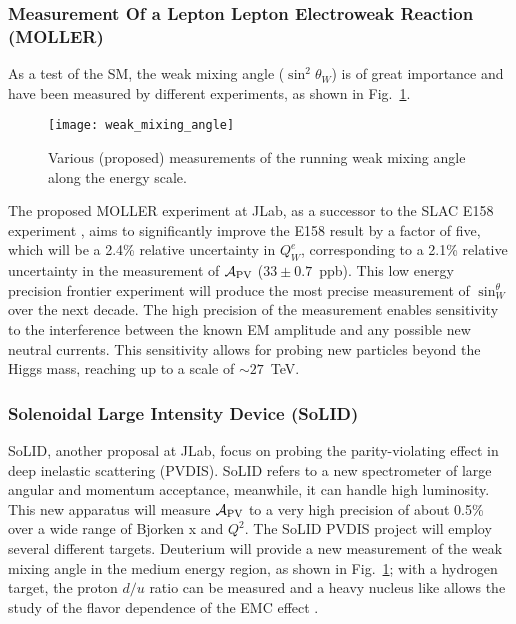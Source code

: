 \subsubsection{Measurement Of a Lepton Lepton Electroweak Reaction (MOLLER)}
As a test of the SM, the weak mixing angle ($\sin^2\theta_W$) is of great importance 
and have been measured by different experiments, as shown in Fig.~\ref{fig:weak_mixing_angle}.

\begin{figure}[!h]
    \centering
    \texttt{[image: weak\_mixing\_angle]}
    \caption{Various (proposed) measurements of the running weak mixing angle
    along the energy scale. }
    \label{fig:weak_mixing_angle}
\end{figure}

The proposed MOLLER experiment at JLab, as a successor to the SLAC E158 experiment \cite{PhysRevLett.95.081601},
aims to significantly improve the E158 result by a factor of five, which will be a 2.4\%
relative uncertainty in $Q_W^e$, corresponding to a 2.1\% relative uncertainty
in the measurement of $\mathcal{A}_{\text{PV}}$ ($33 \pm 0.7$~ppb).
This low energy precision frontier experiment will produce the most precise 
measurement of $\sin^\theta_W$ over the next decade. The high precision of the measurement
enables sensitivity to the interference between the known EM amplitude and any
possible new neutral currents. This sensitivity allows for probing new particles 
beyond the Higgs mass, reaching up to a scale of $\sim 27$~TeV.

\subsubsection{Solenoidal Large Intensity Device (SoLID)}
SoLID, another proposal at JLab, focus on probing the parity-violating effect in deep inelastic
scattering (PVDIS). SoLID refers to a new spectrometer of large angular and momentum
acceptance, meanwhile, it can handle high luminosity. This new apparatus will
measure $\mathcal{A}_{\text{PV}}$ to a very high precision of about 0.5\% over a wide
range of Bjorken x and $Q^2$. The SoLID PVDIS project will employ several
different targets. Deuterium will provide a new measurement of the weak mixing angle
in the medium energy region, as shown in Fig.~\ref{fig:weak_mixing_angle};
with a hydrogen target, the proton $d/u$ ratio can be measured and a heavy
nucleus like \Pb allows the study of the flavor dependence of the EMC effect \cite{Aubert:142300}.


